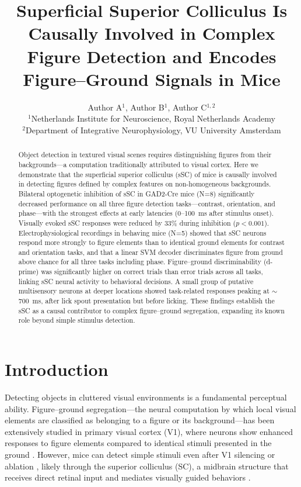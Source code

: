 \documentclass[11pt]{article}
\title{Superficial Superior Colliculus Is Causally Involved in Complex Figure Detection and Encodes Figure--Ground Signals in Mice}
\author{Author A$^{1}$, Author B$^{1}$, Author C$^{1,2}$\\[6pt]
$^{1}$Netherlands Institute for Neuroscience, Royal Netherlands Academy\\
$^{2}$Department of Integrative Neurophysiology, VU University Amsterdam}
\date{}
\begin{document}
\maketitle

\begin{abstract}
Object detection in textured visual scenes requires distinguishing figures from their backgrounds---a computation traditionally attributed to visual cortex. Here we demonstrate that the superficial superior colliculus (sSC) of mice is causally involved in detecting figures defined by complex features on non-homogeneous backgrounds. Bilateral optogenetic inhibition of sSC in GAD2-Cre mice (N=8) significantly decreased performance on all three figure detection tasks---contrast, orientation, and phase---with the strongest effects at early latencies (0--100~ms after stimulus onset). Visually evoked sSC responses were reduced by 33\% during inhibition ($p<0.001$). Electrophysiological recordings in behaving mice (N=5) showed that sSC neurons respond more strongly to figure elements than to identical ground elements for contrast and orientation tasks, and that a linear SVM decoder discriminates figure from ground above chance for all three tasks including phase. Figure--ground discriminability (d-prime) was significantly higher on correct trials than error trials across all tasks, linking sSC neural activity to behavioral decisions. A small group of putative multisensory neurons at deeper locations showed task-related responses peaking at ${\sim}$700~ms, after lick spout presentation but before licking. These findings establish the sSC as a causal contributor to complex figure--ground segregation, expanding its known role beyond simple stimulus detection.
\end{abstract}

\section{Introduction}

Detecting objects in cluttered visual environments is a fundamental perceptual ability. Figure--ground segregation---the neural computation by which local visual elements are classified as belonging to a figure or its background---has been extensively studied in primary visual cortex (V1), where neurons show enhanced responses to figure elements compared to identical stimuli presented in the ground \citep{lamme1995figure, wang2020v1}. However, mice can detect simple stimuli even after V1 silencing or ablation \citep{schneider1969two}, likely through the superior colliculus (SC), a midbrain structure that receives direct retinal input and mediates visually guided behaviors \citep{may2006mammalian, krauzlis2013superior}.
\end{document}
